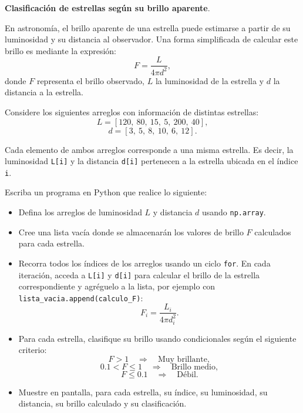 \providecommand{\Needspace}[1]{}
\Needspace{8\baselineskip}
\item \textbf{Clasificación de estrellas según su brillo aparente}.
\nopagebreak[4]

\begin{tcolorbox}[colback=blue!2!white,colframe=blue!55!black,title={Enunciado},breakable]
En astronomía, el brillo aparente de una estrella puede estimarse a partir de su luminosidad y su distancia al observador. Una forma simplificada de calcular este brillo es mediante la expresión:
\[
F = \frac{L}{4\pi d^2},
\]
donde $F$ representa el brillo observado, $L$ la luminosidad de la estrella y $d$ la distancia a la estrella.

Considere los siguientes arreglos con información de distintas estrellas:
\[
L = [120,\ 80,\ 15,\ 5,\ 200,\ 40],
\]
\[
d = [3,\ 5,\ 8,\ 10,\ 6,\ 12].
\]

Cada elemento de ambos arreglos corresponde a una misma estrella. Es decir, la luminosidad \texttt{L[i]} y la distancia \texttt{d[i]} pertenecen a la estrella ubicada en el índice \texttt{i}.

Escriba un programa en Python que realice lo siguiente:

\begin{itemize}
    \item[(a)] Defina los arreglos de luminosidad $L$ y distancia $d$ usando \texttt{np.array}.

    \item[(b)] Cree una lista vacía donde se almacenarán los valores de brillo $F$ calculados para cada estrella.

    \item[(c)] Recorra todos los índices de los arreglos usando un ciclo \texttt{for}. En cada iteración, acceda a \texttt{L[i]} y \texttt{d[i]} para calcular el brillo de la estrella correspondiente y agréguelo a la lista, por ejemplo con \texttt{lista\_vacia.append(calculo\_F)}:
    \[
    F_i = \frac{L_i}{4\pi d_i^2}.
    \]

    \item[(d)] Para cada estrella, clasifique su brillo usando condicionales según el siguiente criterio:
    \[
    F > 1 \quad \Longrightarrow \quad \text{Muy brillante},
    \]
    \[
    0.1 < F \leq 1 \quad \Longrightarrow \quad \text{Brillo medio},
    \]
    \[
    F \leq 0.1 \quad \Longrightarrow \quad \text{Débil}.
    \]

    \item[(e)] Muestre en pantalla, para cada estrella, su índice, su luminosidad, su distancia, su brillo calculado y su clasificación.


\end{itemize}
\end{tcolorbox}
